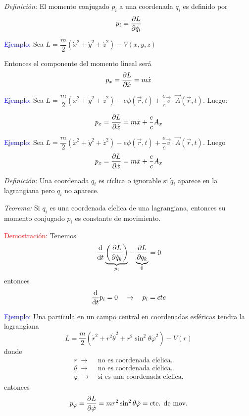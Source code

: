 \documentclass[../main]{subfiles}
\begin{document}
\textit{Definición:} El momento conjugado $p_i$ a una coordenada $q_i$ es definido por 
\begin{equation}
    p_i=\pdv{L}{\dot{q}_i}
\end{equation}

\textcolor{blue}{Ejemplo:} Sea $L=\dfrac{m}{2}(\dot{x}^2+\dot{y}^2+\dot{z}^2)-V(x, y, z)$

Entonces el componente del momento lineal será 
\begin{equation}
    p_x=\pdv{L}{\dot{x}}=m\dot{x}
\end{equation}

\textcolor{blue}{Ejemplo:} Sea $L=\dfrac{m}{2}(\dot{x}^2+\dot{y}^2+\dot{z}^2)-e\phi(\vec{r} , t)+\dfrac{e}{c}\vec{v}\cdot\vec{A}(\vec{r}, t)$. Luego:

\begin{equation}
    p_x=\pdv{L}{\dot{x}}=m\dot{x}+\dfrac{e}{c}A_x
\end{equation}

\textcolor{blue}{Ejemplo:} Sea $L=\dfrac{m}{2}(\dot{x}^2+\dot{y}^2+\dot{z}^2)-e\phi(\vec{r}, t)+\dfrac{e}{c}\vec{v}\cdot \vec{A}(\vec{r}, t)$. Luego 
\begin{equation}
    p_x=\pdv{L}{\dot{x}}=m\dot{x}+\dfrac{e}{c}A_x
\end{equation}

\textit{Definición:} Una coordenada $q_i$ es cíclica o ignorable si $\dot{q}_i$ aparece en la lagrangiana pero $q_i$ no aparece.

\textit{Teorema:} Si $q_i$ es una coordenada cíclica de una lagrangiana, entonces su momento conjugado $p_i$ es constante de movimiento.

\textcolor{red}{Demostración:} Tenemos
\begin{equation*}
    \dv{}{t}\underbrace{\left(\pdv{L}{\dot{q}_k}\right)}_{p_i}-\underbrace{\pdv{L}{q_k}}_{0}=0
\end{equation*}
entonces 
\begin{equation*}
    \dv{}{t}p_i=0 \quad \rightarrow \quad p_i=cte
\end{equation*}

\textcolor{blue}{Ejemplo:} Una partícula en un campo central en coordenadas esféricas tendra la lagrangiana
\begin{equation}
    L=\dfrac{m}{2}(\dot{r}^2+r^2\dot{\theta}^2+r^2\sin^2 \theta \dot{\varphi}^2)-V(r)
\end{equation}
donde 
\begin{align*}
    r \ \rightarrow \ &\text{no es coordenada cíclica.}\\
    \theta \ \rightarrow \ &\text{no es coordenada cíclica.}\\
    \varphi \ \rightarrow \ &\text{si es una coordenada cíclica.}
\end{align*}
entonces 
\begin{equation}
    p_{\varphi}=\pdv{L}{\dot{\varphi}}=mr^2\sin^2 \theta \dot{\varphi}=\text{cte. de mov.}
\end{equation}
\end{document}
